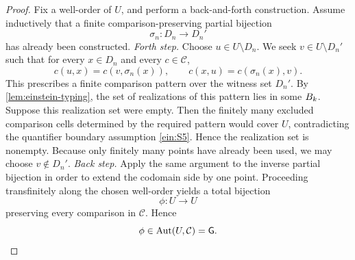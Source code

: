 \begin{proof}
	Fix a well-order of \(U\), and perform a back-and-forth construction.
	Assume inductively that a finite comparison-preserving partial bijection
	\[
		\sigma_n:D_n\to D_n'
	\]
	has already been constructed.
	\smallskip
	\noindent
	\emph{Forth step.}
	Choose \(u\in U\setminus D_n\).
	We seek \(v\in U\setminus D_n'\) such that for every \(x\in D_n\) and
	every \(c\in\mathcal C\),
	\[
		c(u,x)=c(v,\sigma_n(x)),
		\qquad
		c(x,u)=c(\sigma_n(x),v).
	\]
	This prescribes a finite comparison pattern over the witness set
	\(D_n'\).
	By \cref{lem:einstein-typing}, the set of realizations of this pattern
	lies in some \(B_k\).
	Suppose this realization set were empty.
	Then the finitely many excluded comparison cells determined by the
	required pattern would cover \(U\), contradicting the quantifier
	boundary assumption \ref{ein:S5}.
	Hence the realization set is nonempty.
	Because only finitely many points have already been used, we may choose
	\(v\notin D_n'\).
	\smallskip
	\noindent
	\emph{Back step.}
	Apply the same argument to the inverse partial bijection in order to
	extend the codomain side by one point.
	\smallskip
	Proceeding transfinitely along the chosen well-order yields a total
	bijection
	\[
		\phi:U\to U
	\]
	preserving every comparison in \(\mathcal C\).
	Hence
	\[
		\phi\in\operatorname{Aut}(U,\mathcal C)=\mathsf G.
	\]
\end{proof}

